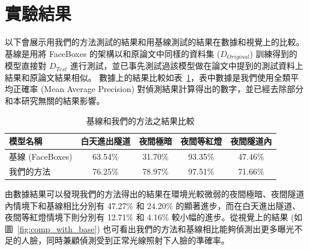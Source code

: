 \section{實驗結果}

以下會展示用我們的方法測試的結果和用基線測試的結果在數據和視覺上的比較。基線是用將 FaceBoxes 的架構以和原論文中同樣的資料集 ($D_{Original}$) 訓練得到的模型直接對 $D_{Test}$ 進行測試，並已事先測試過該模型做在論文中提到的測試資料上結果和原論文結果相似。
數據上的結果比較如表~\ref{table:baseline_compare}，表中數據是我們使用全類平均正確率 (Mean Average Precision) 對偵測結果計算得出的數字，並已經去除部分和本研究無關的結果影響。
\begin{table}[ht]
    \caption{基線和我們的方法之結果比較}
    \centering
    \begin{tabular}{l c c c c}
        \hline
        模型名稱 & 白天進出隧道 & 夜間極暗 & 夜間等紅燈 & 夜間隧道內 \\
        \hline
        基線 (FaceBoxes) & 63.54\% & 31.70\% & 93.35\% & 47.46\% \\
        我們的方法 & 76.25\% & 78.97\% & 97.51\% & 71.66\% \\
        \hline
    \end{tabular}
    \label{table:baseline_compare}
\end{table}

由數據結果可以發現我們的方法得出的結果在環境光較微弱的夜間極暗、夜間隧道內情境下和基線相比分別有 47.27\% 和 24.20\% 的顯著進步，而在白天進出隧道、夜間等紅燈情境下則分別有 12.71\% 和 4.16\% 較小幅的進步。從視覺上的結果 (如圖~\ref{fig:comp_with_base}) 也可看出我們的方法和基線相比能夠偵測出更多曝光不足的人臉，同時兼顧偵測受到正常光線照射下人臉的準確率。

